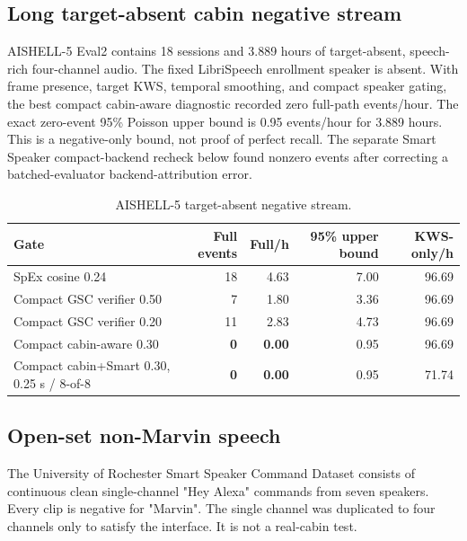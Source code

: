 \documentclass[11pt,a4paper]{article}
\begin{document}
\subsection{Long target-absent cabin negative stream}

AISHELL-5 Eval2 contains 18 sessions and 3.889 hours of target-absent,
speech-rich four-channel audio. The fixed LibriSpeech enrollment speaker is
absent. With frame presence, target KWS, temporal smoothing, and compact
speaker gating, the best compact cabin-aware diagnostic recorded zero
full-path events/hour. The exact zero-event 95\% Poisson upper bound is
0.95 events/hour for 3.889 hours. This is a negative-only bound, not proof
of perfect recall. The separate Smart Speaker compact-backend recheck below
found nonzero events after correcting a batched-evaluator backend-attribution
error.

\begin{table}[H]
\centering
\caption{AISHELL-5 target-absent negative stream.}
\label{tab:aishell-negative}
\small
\begin{tabular}{@{}lrrrr@{}}
\toprule
\textbf{Gate} & \textbf{Full events} & \textbf{Full/h} & \textbf{95\% upper bound} & \textbf{KWS-only/h}\\
\midrule
SpEx cosine 0.24 & 18 & 4.63 & 7.00 & 96.69\\
Compact GSC verifier 0.50 & 7 & 1.80 & 3.36 & 96.69\\
Compact GSC verifier 0.20 & 11 & 2.83 & 4.73 & 96.69\\
Compact cabin-aware 0.30 & \textbf{0} & \textbf{0.00} & 0.95 & 96.69\\
Compact cabin+Smart 0.30, 0.25 s / 8-of-8 & \textbf{0} & \textbf{0.00} & 0.95 & 71.74\\
\bottomrule
\end{tabular}
\end{table}

\subsection{Open-set non-Marvin speech}

The University of Rochester Smart Speaker Command Dataset consists of
continuous clean single-channel "Hey Alexa" commands from seven speakers.
Every clip is negative for "Marvin". The single channel was duplicated to
four channels only to satisfy the interface. It is not a real-cabin test.
\end{document}
